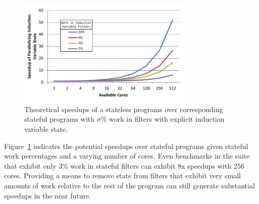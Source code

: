 \begin{figure}[t!]
\includegraphics[width=3.3in]{figures/theoretic-speedup.pdf}
\caption{Theoretical speedups of a stateless programs over corresponding
  stateful programs with $\sigma$\% work in filters with explicit
  induction variable state.  \protect\label{fig:theo-speedups}}
\end{figure}

Figure~\ref{fig:theo-speedups} indicates the potential speedups over stateful programs given stateful work percentages and a varying number of cores.  Even benchmarks in the suite that exhibit only 3\% work in stateful filters can exhibit 8x speedups with 256 cores.  Providing a means to remove state from filters that exhibit very small amounts of work relative to the rest of the program can still generate substantial speedups in the near future.

